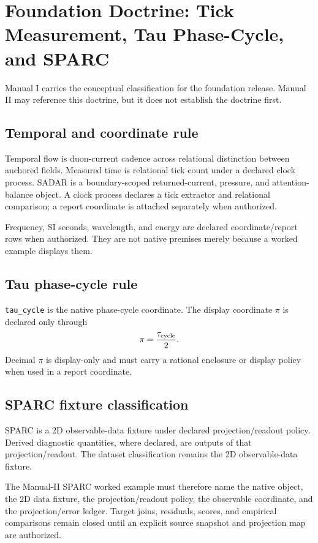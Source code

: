 
\section{Foundation Doctrine: Tick Measurement, Tau Phase-Cycle, and SPARC}

Manual I carries the conceptual classification for the foundation release.  Manual II may reference this doctrine, but it does not establish the doctrine first.

\subsection{Temporal and coordinate rule}

Temporal flow is duon-current cadence across relational distinction between anchored fields. Measured time is relational tick count under a declared clock process. SADAR is a boundary-scoped returned-current, pressure, and attention-balance object. A clock process declares a tick extractor and relational comparison; a report coordinate is attached separately when authorized.

Frequency, SI seconds, wavelength, and energy are declared coordinate/report rows when authorized.  They are not native premises merely because a worked example displays them.

\subsection{Tau phase-cycle rule}

\texttt{tau\_cycle} is the native phase-cycle coordinate.  The display coordinate \(\pi\) is declared only through
\[
\pi = \frac{\tau_{\rm cycle}}{2}.
\]
Decimal \(\pi\) is display-only and must carry a rational enclosure or display policy when used in a report coordinate.

\subsection{SPARC fixture classification}

SPARC is a 2D observable-data fixture under declared projection/readout policy. Derived diagnostic quantities, where declared, are outputs of that projection/readout. The dataset classification remains the 2D observable-data fixture.

The Manual-II SPARC worked example must therefore name the native object, the 2D data fixture, the projection/readout policy, the observable coordinate, and the projection/error ledger.  Target joins, residuals, scores, and empirical comparisons remain closed until an explicit source snapshot and projection map are authorized.


